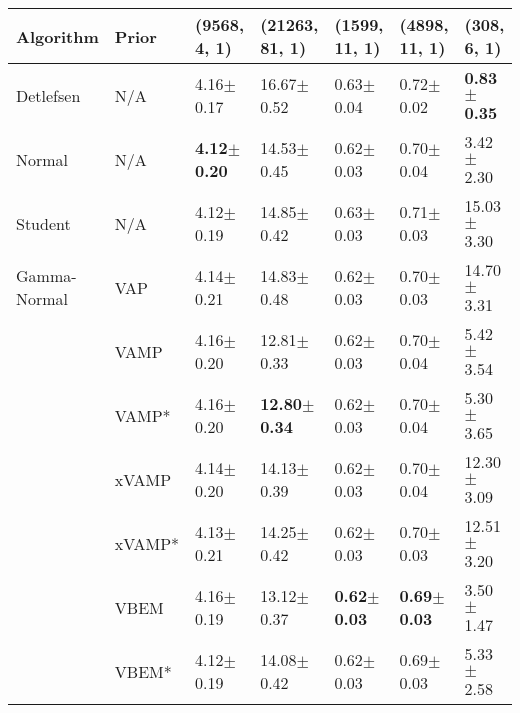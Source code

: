 \begin{tabular}{lllllll}
Algorithm & Prior& (9568, 4, 1)& (21263, 81, 1)& (1599, 11, 1)& (4898, 11, 1)& (308, 6, 1)\\
\midrule
Detlefsen & N/A &           4.16$\pm$0.17 &           16.67$\pm$0.52 &           0.63$\pm$0.04 &           0.72$\pm$0.02 &  \textbf{0.83$\pm$0.35} \\
Normal & N/A &  \textbf{4.12$\pm$0.20} &           14.53$\pm$0.45 &           0.62$\pm$0.03 &           0.70$\pm$0.04 &           3.42$\pm$2.30 \\
Student & N/A &           4.12$\pm$0.19 &           14.85$\pm$0.42 &           0.63$\pm$0.03 &           0.71$\pm$0.03 &          15.03$\pm$3.30 \\
Gamma-Normal & VAP &           4.14$\pm$0.21 &           14.83$\pm$0.48 &           0.62$\pm$0.03 &           0.70$\pm$0.03 &          14.70$\pm$3.31 \\
             & VAMP &           4.16$\pm$0.20 &           12.81$\pm$0.33 &           0.62$\pm$0.03 &           0.70$\pm$0.04 &           5.42$\pm$3.54 \\
             & VAMP* &           4.16$\pm$0.20 &  \textbf{12.80$\pm$0.34} &           0.62$\pm$0.03 &           0.70$\pm$0.04 &           5.30$\pm$3.65 \\
             & xVAMP &           4.14$\pm$0.20 &           14.13$\pm$0.39 &           0.62$\pm$0.03 &           0.70$\pm$0.04 &          12.30$\pm$3.09 \\
             & xVAMP* &           4.13$\pm$0.21 &           14.25$\pm$0.42 &           0.62$\pm$0.03 &           0.70$\pm$0.03 &          12.51$\pm$3.20 \\
             & VBEM &           4.16$\pm$0.19 &           13.12$\pm$0.37 &  \textbf{0.62$\pm$0.03} &  \textbf{0.69$\pm$0.03} &           3.50$\pm$1.47 \\
             & VBEM* &           4.12$\pm$0.19 &           14.08$\pm$0.42 &           0.62$\pm$0.03 &           0.69$\pm$0.03 &           5.33$\pm$2.58 \\
\bottomrule
\end{tabular}

